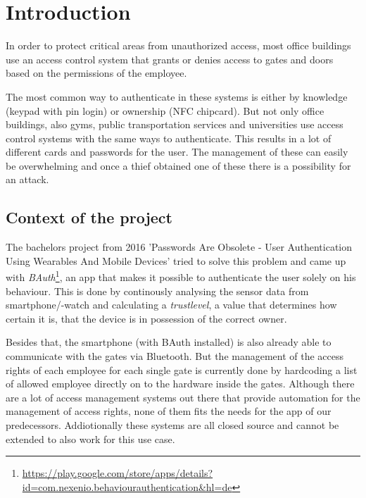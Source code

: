 \section{Introduction}

In order to protect critical areas from unauthorized access, most office buildings use an access control system that grants or denies access to gates and doors based on the permissions of the employee.

The most common way to authenticate in these systems is either by knowledge (keypad with pin login) or ownership (NFC chipcard).
But not only office buildings, also gyms, public transportation services and universities use access control systems with the same ways to authenticate. This results in a lot of different cards and passwords for the user. The management of these can easily be overwhelming and once a thief obtained one of these there is a possibility for an attack.

\subsection{Context of the project}
\label{Context of the project}

The bachelors project from 2016 'Passwords Are Obsolete - User Authentication Using Wearables And Mobile Devices' tried to solve this problem and came up with \emph{BAuth}\footnote{\url{https://play.google.com/store/apps/details?id=com.nexenio.behaviourauthentication&hl=de}}, an app that makes it possible to authenticate the user solely on his behaviour. This is done by continously analysing the sensor data from smartphone/-watch and calculating a \emph{trustlevel}, a value that determines how certain it is, that the device is in possession of the correct owner.

Besides that, the smartphone (with BAuth installed) is also already able to communicate with the gates via Bluetooth. But the management of the access rights of each employee for each single gate is currently done by hardcoding a list of allowed employee directly on to the hardware inside the gates. Although there are a lot of access management systems out there that provide automation for the management of access rights, none of them fits the needs for the app of our predecessors. Addiotionally these systems are all closed source and cannot be extended to also work for this use case. 


